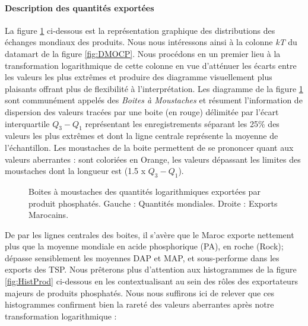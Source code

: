 	\paragraph{Description des quantités exportées\\}
	La figure \ref{fig:BAM} ci-dessous est la représentation graphique des distributions des échanges mondiaux des produits. Nous nous intéressons ainsi à la colonne \textit{kT} du datamart de la figure \ref{fig:DMOCP}. Nous procédons en un premier lieu à la transformation logarithmique de cette colonne en vue d'atténuer les écarts entre les valeurs les plus extrêmes et produire des diagramme visuellement plus plaisants offrant plus de flexibilité à l'interprétation. Les diagramme de la figure \ref{fig:BAM} sont communément appelés des \textit{Boites à Moustaches} et résument l'information de dispersion des valeurs tracées par une boite (en rouge) délimitée par l'écart interquartile $Q_3 - Q_1$ représentant les enregistrements séparant les 25\% des valeurs les plus extrêmes et dont la ligne centrale représente la moyenne de l'échantillon. Les moustaches de la boite permettent de se prononcer quant aux valeurs aberrantes : sont coloriées en Orange, les valeurs dépassant les limites des moustaches dont la longueur est (1.5 x $Q_3 - Q_1$).
			\begin{figure}[H]
			\centering
			\caption{Boites à moustaches des quantités logarithmiques exportées par produit phosphatés. Gauche : Quantités mondiales. Droite : Exports Marocains.}
			\label{fig:BAM}
			\end{figure}
			\newpage
			De par les lignes centrales des boites, il s'avère que le Maroc exporte nettement plus que la moyenne mondiale en acide phosphorique (PA), en roche (Rock); dépasse sensiblement les moyennes DAP et MAP, et sous-performe dans les exports des TSP. Nous prêterons plus d'attention aux histogrammes de la figure \ref{fig:HistProd} ci-dessous en les contextualisant au sein des rôles des exportateurs majeurs de produits phosphatés. Nous nous suffirons ici de relever que ces histogrammes confirment bien la rareté des valeurs aberrantes après notre transformation logarithmique : 
